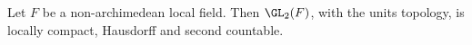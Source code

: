Let $F$ be a non-archimedean local field. Then $\GL_2(F)$, with the units topology, is locally compact, Hausdorff and
second countable.
